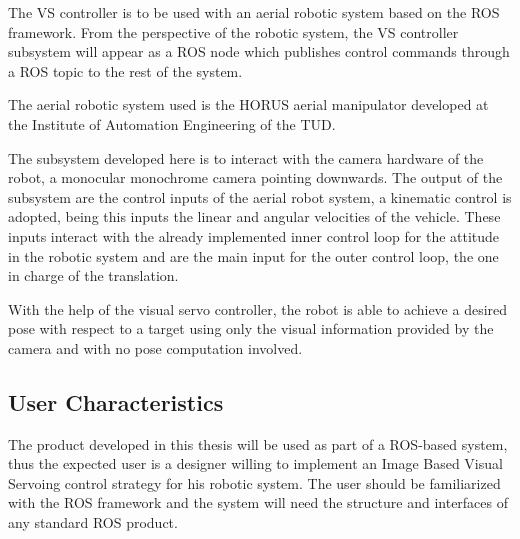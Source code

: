 The VS controller is to be used with an aerial robotic system based on the ROS framework. From the perspective of the robotic system, the VS controller subsystem will appear as a ROS node which publishes control commands through a ROS topic to the rest of the system.



The aerial robotic system used is the HORUS aerial manipulator developed at the Institute of Automation Engineering of the TUD.



The subsystem developed here is to interact with the camera hardware of the robot, a monocular monochrome camera pointing downwards. The output of the subsystem are the control inputs of the aerial robot system, a kinematic control is adopted, being this inputs the linear and angular velocities of the vehicle. These inputs interact with the already implemented inner control loop for the attitude in the robotic system and are the main input for the outer control loop, the one in charge of the translation.




With the help of the visual servo controller, the robot is able to achieve a desired pose with respect to a target using only the visual information provided by the camera and with no pose computation involved.

\subsection{User Characteristics}
\label{sec:user-characteristics}

The product developed in this thesis will be used as part of a ROS-based system, thus the expected user is a designer willing to implement an Image Based Visual Servoing control strategy for his robotic system. The user should be familiarized with the ROS framework and the system will need the structure and interfaces of any standard ROS product.


